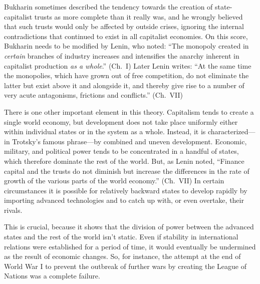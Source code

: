 Bukharin sometimes described the tendency towards the creation of state-capitalist trusts as more complete than it really was, and he wrongly believed that such trusts would only be affected by outside crises, ignoring the internal contradictions that continued to exist in all capitalist economies. On this score, Bukharin needs to be modified by Lenin, who noted: ``The monopoly created in \emph{certain} branches of industry increases and intensifies the anarchy inherent in capitalist production \emph{as a whole}.'' (Ch.\ I) Later Lenin writes: ``At the same time the monopolies, which have grown out of free competition, do not eliminate the latter but exist above it and alongside it, and thereby give rise to a number of very acute antagonisms, frictions and conflicts.'' (Ch.\ VII)

There is one other important element in this theory. Capitalism tends to create a single world economy, but development does not take place uniformly either within individual states or in the system as a whole. Instead, it is characterized---in Trotsky's famous phrase---by combined and uneven development. Economic, military, and political power tends to be concentrated in a handful of states, which therefore dominate the rest of the world. But, as Lenin noted, ``Finance capital and the trusts do not diminish but increase the differences in the rate of growth of the various parts of the world economy.'' (Ch.\ VII) In certain circumstances it is possible for relatively backward states to develop rapidly by importing advanced technologies and to catch up with, or even overtake, their rivals.

This is crucial, because it shows that the division of power between the advanced states and the rest of the world isn't static. Even if stability in international relations were established for a period of time, it would eventually be undermined as the result of economic changes. So, for instance, the attempt at the end of World War I to prevent the outbreak of further wars by creating the League of Nations was a complete failure.

